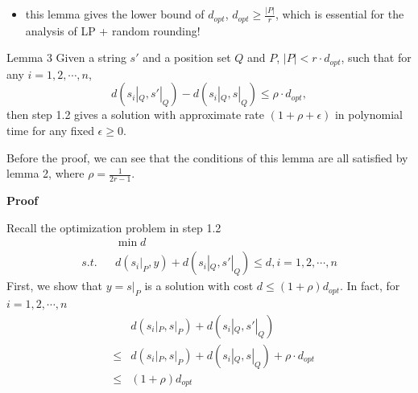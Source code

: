 \documentclass[slidestop,compress,mathserif,10pt]{beamer}
\begin{document}
{\begin{itemize}
	\item this lemma gives the lower bound of $d_{opt}$, $d_{opt} \ge \frac{|P|}{r}$, which is essential for the analysis of LP + random rounding!
\end{itemize}


\begin{block}{Lemma 3}
	Given a string $s'$ and a position set $Q$ and $P$, $|P| < r\cdot d_{opt}$, such that for any $i=1,2,\cdots, n$,
	$$d(s_i|_Q,s'|_Q) - d(s_i|_Q, s|_Q) \le \rho \cdot d_{opt},$$
	then step 1.2 gives a solution with approximate rate $(1+\rho + \epsilon)$ in polynomial time for any fixed $\epsilon \ge 0$.
\end{block}

Before the proof, we can see that the conditions of this lemma are all satisfied by lemma 2, where $\rho = \frac{1}{2r-1}$.

{\bf Proof}

	Recall the optimization problem in step 1.2
	\begin{eqnarray*}
		&&\min d\\
		s.t. && d(s_i|_P, y) + d(s_i|_Q, s'|_Q) \le d, i=1,2,\cdots,n
	\end{eqnarray*}
	First, we show that $y=s|_P$ is a solution with cost $d \le (1+\rho)d_{opt}$. In fact, for $ i=1,2,\cdots,n$
	\begin{eqnarray*}
		& & d(s_i|_P, s|_P) + d(s_i|_Q, s'|_Q)\\ 
		& \le & d(s_i|_P, s|_P) + d(s_i|_Q, s|_Q) + \rho \cdot d_{opt} \\
		& \le & (1+\rho)d_{opt}
	\end{eqnarray*}
	
}
\end{document}
